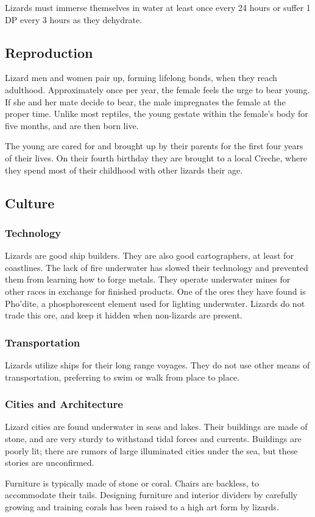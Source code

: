 \begin{multicols*}{2}
Lizards must immerse themselves in water at least once every 24 hours or suffer 1 DP every 3 hours as they dehydrate.
\subsection{Reproduction}
Lizard men and women pair up, forming lifelong bonds, when they reach adulthood. Approximately once per year, the female feels the urge to bear young. If she and her mate decide to bear, the male impregnates the female at the proper time. Unlike most reptiles, the young gestate within the female's body for five months, and are then born live.

The young are cared for and brought up by their parents for the first four years of their lives. On their fourth birthday they are brought to a local Creche, where they spend most of their childhood with other lizards their age.
\subsection{Culture}
\subsubsection{Technology}
Lizards are good ship builders. They are also good cartographers, at least for coastlines. The lack of fire underwater has slowed their technology and prevented them
from learning how to forge metals. They operate underwater mines for other races in exchange for finished products. One of the ores they have found is Pho'dite, a phosphorescent element used for lighting underwater. Lizards do not trade this ore, and keep it hidden when non-lizards are present.
\subsubsection{Transportation}
Lizards utilize ships for their long range voyages. They do not use other means of transportation, preferring to swim or walk from place to place.
\subsubsection{Cities and Architecture}
Lizard cities are found underwater in seas and lakes. Their buildings are made of stone, and are very sturdy to withstand tidal forces and currents. Buildings are poorly lit; there are rumors of large illuminated cities under the sea, but these stories are unconfirmed.

Furniture is typically made of stone or coral. Chairs are backless, to accommodate their tails. Designing furniture and interior dividers by carefully growing and training corals has been raised to a high art form by lizards.

\end{multicols*}

